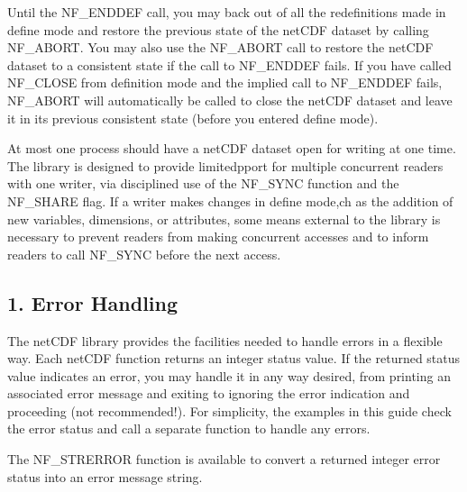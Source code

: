 Until the N\+F\+\_\+\+E\+N\+D\+D\+EF call, you may back out of all the redefinitions made in define mode and restore the previous state of the net\+C\+DF dataset by calling N\+F\+\_\+\+A\+B\+O\+RT. You may also use the N\+F\+\_\+\+A\+B\+O\+RT call to restore the net\+C\+DF dataset to a consistent state if the call to N\+F\+\_\+\+E\+N\+D\+D\+EF fails. If you have called N\+F\+\_\+\+C\+L\+O\+SE from definition mode and the implied call to N\+F\+\_\+\+E\+N\+D\+D\+EF fails, N\+F\+\_\+\+A\+B\+O\+RT will automatically be called to close the net\+C\+DF dataset and leave it in its previous consistent state (before you entered define mode).

At most one process should have a net\+C\+DF dataset open for writing at one time. The library is designed to provide limitedpport for multiple concurrent readers with one writer, via disciplined use of the N\+F\+\_\+\+S\+Y\+NC function and the N\+F\+\_\+\+S\+H\+A\+RE flag. If a writer makes changes in define mode,ch as the addition of new variables, dimensions, or attributes, some means external to the library is necessary to prevent readers from making concurrent accesses and to inform readers to call N\+F\+\_\+\+S\+Y\+NC before the next access.\hypertarget{nc_f77_interface_guide_f77_Error_Handling_1_5}{}\subsection{1. Error Handling }\label{nc_f77_interface_guide_f77_Error_Handling_1_5}
The net\+C\+DF library provides the facilities needed to handle errors in a flexible way. Each net\+C\+DF function returns an integer status value. If the returned status value indicates an error, you may handle it in any way desired, from printing an associated error message and exiting to ignoring the error indication and proceeding (not recommended!). For simplicity, the examples in this guide check the error status and call a separate function to handle any errors.

The N\+F\+\_\+\+S\+T\+R\+E\+R\+R\+OR function is available to convert a returned integer error status into an error message string.

